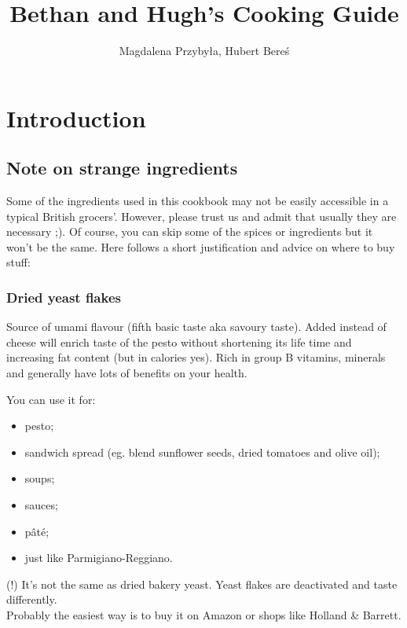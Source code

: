 \documentclass[%
twoside,
11pt
]{article}
\begin{document}
\frontmatter
\title{Bethan and Hugh's Cooking Guide}
\author{Magdalena Przybyła, Hubert Bereś}

\maketitle
\thispagestyle{empty}
\newpage

\tableofcontents

\mainmatter
\chapter{Introduction}

\section*{Note on strange ingredients}

Some of the ingredients used in this cookbook may not be easily accessible in a typical British grocers'. However, please trust us and admit that usually they are necessary ;). Of course, you can skip some of the spices or ingredients but it won't be the same. Here follows a short justification and advice on where to buy stuff: 

\subsection*{Dried yeast flakes}

Source of umami flavour (fifth basic taste aka savoury taste). Added instead of cheese will enrich taste of the pesto without shortening its life time and increasing fat content (but in calories yes). Rich in group B vitamins, minerals and generally have lots of benefits on your health. 

You can use it for:

\begin{itemize}
    \setlength\itemsep{0.1mm}
    \item pesto;
    \item sandwich spread (eg. blend sunflower seeds, dried tomatoes and olive oil);
    \item soups;
    \item sauces; 
    \item pâté;
    \item just like Parmigiano-Reggiano.
\end{itemize}

(!) It's not the same as dried bakery yeast.
Yeast flakes are deactivated and taste differently.
\\
Probably the easiest way is to buy it on Amazon or shops like Holland \& Barrett.
\end{document}
